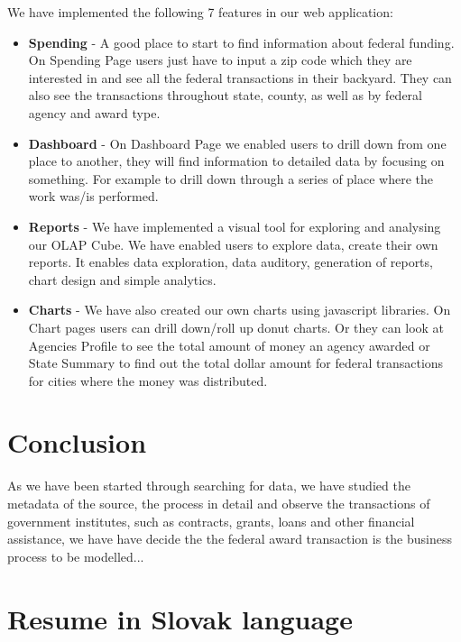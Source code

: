 \documentclass[letterpaper,10pt,oneside]{sphinxmanual}
\begin{document}
We have implemented the following 7 features in our web application:
\begin{itemize}
\item {} 
\textbf{Spending} - A good place to start to find information about federal funding.
On Spending Page users just have to input a zip code which they are interested in and
see all the federal transactions in their backyard. They can also see the transactions throughout state,
county, as well as by federal agency and award type.

\item {} 
\textbf{Dashboard} - On Dashboard Page we enabled users to drill down from one place to another,
they will find information to detailed data by focusing on something. For example to drill down through
a series of place where the work was/is performed.

\item {} 
\textbf{Reports} - We have implemented a visual tool for exploring and analysing our OLAP Cube.
We  have enabled users to explore data, create their own reports. It enables data exploration,
data auditory, generation of reports, chart design and simple analytics.

\item {} 
\textbf{Charts} - We have also created our own charts using javascript libraries.
On Chart pages users can drill down/roll up donut charts. Or they can look at Agencies
Profile to see the total amount of money an agency awarded or State Summary to find out
the total dollar amount for federal transactions for cities where the money was distributed.

\end{itemize}


\chapter{Conclusion}
\label{conclusion:conclusion}\label{conclusion::doc}
As we have been started through searching for data, we have studied the metadata of the source,
the process in detail and observe the transactions of government institutes, such as contracts,
grants, loans and other financial assistance, we have have decide the the federal award transaction
is the business process to be modelled...


\chapter{Resume in Slovak language}
\label{resume:resume-in-slovak-language}\label{resume::doc}
\end{document}
